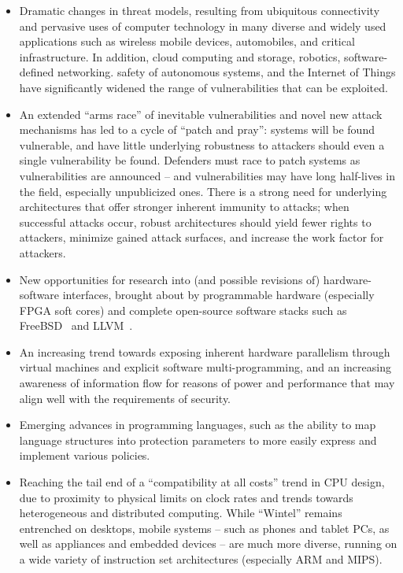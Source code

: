 \begin{itemize}
\item Dramatic changes in threat models, resulting from ubiquitous
connectivity and pervasive uses of computer technology in many
diverse and widely used applications such as wireless mobile
devices, automobiles, and critical infrastructure.
In addition, cloud computing and storage, robotics, software-defined
networking.  safety of autonomous systems, and the Internet of Things have
significantly widened the range of vulnerabilities that can be exploited.

\item An extended ``arms race'' of inevitable vulnerabilities and novel new
attack mechanisms has led to a cycle of ``patch and pray'': systems will be
found vulnerable, and have little underlying robustness to attackers should
even a single vulnerability be found.
Defenders must race to patch systems as vulnerabilities are announced -- and
vulnerabilities may have long half-lives in the field, especially unpublicized ones.
There is a strong need for underlying architectures that offer stronger
inherent immunity to attacks; when successful attacks occur, robust
architectures should yield fewer rights to attackers, minimize gained attack
surfaces, and increase the work factor for attackers.

\item New opportunities for research into (and possible revisions of)
hardware-software interfaces, brought about by programmable hardware
(especially FPGA soft cores)
and complete open-source software stacks such as
FreeBSD~\cite{mckusick:freebsd} and LLVM~\cite{LA04}.

\item An increasing trend towards exposing inherent hardware parallelism
through virtual machines and explicit software
multi-programming, and an increasing awareness of information flow
for reasons of power and performance that may align well with the
requirements of security.

\item Emerging advances in programming languages, such as the ability
to map language structures into protection parameters to
more easily express and implement various policies.

\item Reaching the tail end of a ``compatibility at all costs'' trend in
CPU design, due to
proximity to physical limits on clock rates and
trends towards heterogeneous and distributed computing.
While ``Wintel'' remains entrenched on desktops, mobile systems -- such as
phones and tablet PCs, as well as appliances and embedded devices -- are
much more diverse, running on a wide variety of instruction set architectures
(especially ARM and MIPS).


\end{itemize}
